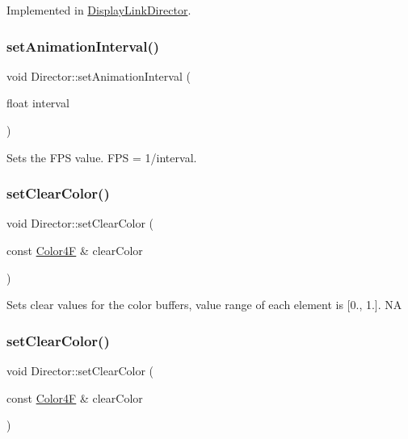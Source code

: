 Implemented in \hyperlink{classDisplayLinkDirector_ab433b1840297793f0723d673f8efea14}{Display\+Link\+Director}.

\mbox{\label{classDirector_aa6bb2738f121a6e9076a27c7916c38a5}} 
\subsubsection{\texorpdfstring{set\+Animation\+Interval()}{setAnimationInterval()}\hspace{0.1cm}{\footnotesize\ttfamily [2/2]}}
{\footnotesize\ttfamily void Director\+::set\+Animation\+Interval (\begin{DoxyParamCaption}\item[{float}]{interval }\end{DoxyParamCaption})}

Sets the F\+PS value. F\+PS = 1/interval. \mbox{\label{classDirector_a50fe8a47a3b94dc42366099e5862de40}} 
\subsubsection{\texorpdfstring{set\+Clear\+Color()}{setClearColor()}\hspace{0.1cm}{\footnotesize\ttfamily [1/2]}}
{\footnotesize\ttfamily void Director\+::set\+Clear\+Color (\begin{DoxyParamCaption}\item[{const \hyperlink{structColor4F}{Color4F} \&}]{clear\+Color }\end{DoxyParamCaption})}

Sets clear values for the color buffers, value range of each element is \mbox{[}0., 1.\mbox{]}.  NA \mbox{\label{classDirector_a50fe8a47a3b94dc42366099e5862de40}} 
\subsubsection{\texorpdfstring{set\+Clear\+Color()}{setClearColor()}\hspace{0.1cm}{\footnotesize\ttfamily [2/2]}}
{\footnotesize\ttfamily void Director\+::set\+Clear\+Color (\begin{DoxyParamCaption}\item[{const \hyperlink{structColor4F}{Color4F} \&}]{clear\+Color }\end{DoxyParamCaption})}

